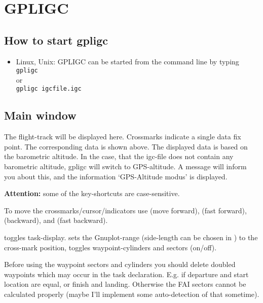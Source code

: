 \section{GPLIGC}

\subsection{How to start gpligc}

\begin{itemize}
\item{Linux, Unix:}
GPLIGC can be started from the command line by typing \\
\texttt{gpligc}\\
or\\
\texttt{gpligc  igcfile.igc}


\end{itemize}

\subsection{Main window}
The flight-track will be displayed here.
Crossmarks indicate a single data fix point.
The corresponding data is shown above.
The displayed data is based on the barometric altitude.
In the case, that the igc-file does not contain any barometric altitude,
gpligc will switch to GPS-altitude.
A message will inform you about this, and
the information `GPS-Altitude modus' is displayed.

\textbf{Attention:} some of the key-shortcuts are case-sensitive.

To move the crossmarks/cursor/indicators use  (move forward),  (fast forward),  (backward), and  (fast backward).

 toggles task-display.
 sets the Gnuplot-range (side-length can be chosen in ) to the cross-mark position,
 toggles waypoint-cylinders and sectors (on/off).

Before using the waypoint sectors and cylinders you should delete doubled waypoints which may occur in the task declaration. E.g. if departure and start location are equal, or finish and landing.
Otherwise the FAI sectors cannot be calculated properly (maybe I'll implement some auto-detection of that sometime).

